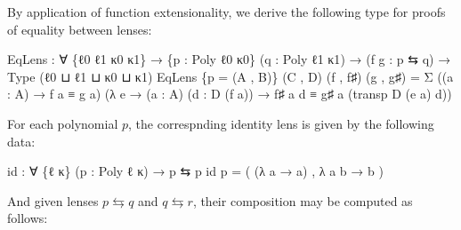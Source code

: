 \documentclass[
  11pt,
  oneside,
  article]{memoir}
\newenvironment{Shaded}{}{}
\newcommand{\NormalTok}[1]{#1}
\newcommand{\OtherTok}[1]{\textcolor[rgb]{0.00,0.44,0.13}{#1}}
\theoremstyle{definition}
\theoremstyle{plain}
\newcommand{\0}{\textsf{0}}
\newcommand{\1}{\tn{\textsf{1}}}
\begin{document}
By application of function extensionality, we derive the following type
for proofs of equality between lenses:

\begin{Shaded}
\begin{Highlighting}[]
\NormalTok{EqLens }\OtherTok{:} \OtherTok{∀} \OtherTok{\{}\NormalTok{ℓ0 ℓ1 κ0 κ1}\OtherTok{\}}
         \OtherTok{→} \OtherTok{\{}\NormalTok{p }\OtherTok{:}\NormalTok{ Poly ℓ0 κ0}\OtherTok{\}} \OtherTok{(}\NormalTok{q }\OtherTok{:}\NormalTok{ Poly ℓ1 κ1}\OtherTok{)}
         \OtherTok{→} \OtherTok{(}\NormalTok{f g }\OtherTok{:}\NormalTok{ p ⇆ q}\OtherTok{)} \OtherTok{→}\NormalTok{ Type }\OtherTok{(}\NormalTok{ℓ0 ⊔ ℓ1 ⊔ κ0 ⊔ κ1}\OtherTok{)}
\NormalTok{EqLens }\OtherTok{\{}\NormalTok{p }\OtherTok{=} \OtherTok{(}\NormalTok{A , B}\OtherTok{)\}} \OtherTok{(}\NormalTok{C , D}\OtherTok{)} \OtherTok{(}\NormalTok{f , f♯}\OtherTok{)} \OtherTok{(}\NormalTok{g , g♯}\OtherTok{)} \OtherTok{=}
\NormalTok{  Σ }\OtherTok{((}\NormalTok{a }\OtherTok{:}\NormalTok{ A}\OtherTok{)} \OtherTok{→}\NormalTok{ f a ≡ g a}\OtherTok{)}
    \OtherTok{(λ}\NormalTok{ e }\OtherTok{→} \OtherTok{(}\NormalTok{a }\OtherTok{:}\NormalTok{ A}\OtherTok{)} \OtherTok{(}\NormalTok{d }\OtherTok{:}\NormalTok{ D }\OtherTok{(}\NormalTok{f a}\OtherTok{))} 
           \OtherTok{→}\NormalTok{ f♯ a d ≡ g♯ a }\OtherTok{(}\NormalTok{transp D }\OtherTok{(}\NormalTok{e a}\OtherTok{)}\NormalTok{ d}\OtherTok{))}
\end{Highlighting}
\end{Shaded}

For each polynomial \(p\), the correspnding identity lens is given by
the following data:

\begin{Shaded}
\begin{Highlighting}[]
\NormalTok{id }\OtherTok{:} \OtherTok{∀} \OtherTok{\{}\NormalTok{ℓ κ}\OtherTok{\}} \OtherTok{(}\NormalTok{p }\OtherTok{:}\NormalTok{ Poly ℓ κ}\OtherTok{)} \OtherTok{→}\NormalTok{ p ⇆ p}
\NormalTok{id p }\OtherTok{=} \OtherTok{(} \OtherTok{(λ}\NormalTok{ a }\OtherTok{→}\NormalTok{ a}\OtherTok{)}\NormalTok{ , }\OtherTok{λ}\NormalTok{ a b }\OtherTok{→}\NormalTok{ b }\OtherTok{)}
\end{Highlighting}
\end{Shaded}

And given lenses \(p \leftrightarrows q\) and \(q \leftrightarrows r\),
their composition may be computed as follows:
\end{document}
